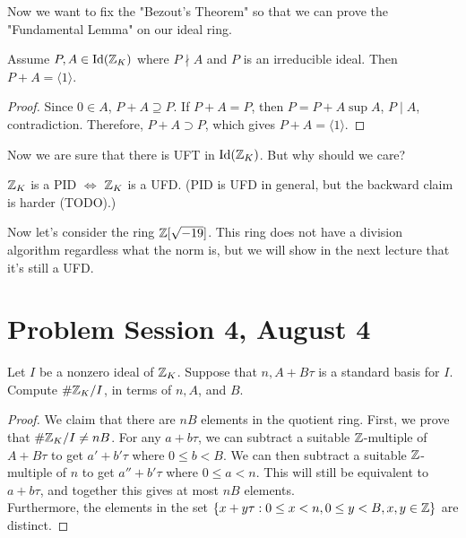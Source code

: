 \documentclass[12pt,twoside=semi,openright,numbers=noenddot]{scrbook}
\begin{document}
Now we want to fix the "Bezout's Theorem" so that we can prove the "Fundamental Lemma" on our ideal ring.
\begin{theorem}
    Assume $P, A \in \text{Id}(\mathbb Z_K)$ where $P \nmid A$ and $P$ is an irreducible ideal. Then $P+A = \langle 1 \rangle$.
\end{theorem}
    \begin{proof}
        Since $0 \in A$, $P+A \supseteq P$. If $P+A = P$, then $P = P+A \sup A$, $P \mid A$, contradiction.
        Therefore, $P+A \supset P$, which gives $P+A = \langle 1 \rangle$.
    \end{proof}

Now we are sure that there is UFT in $\text{Id}(\mathbb Z_K)$. But why should we care?
\begin{remark}
    $\mathbb Z_K$ is a PID $\Leftrightarrow$ $\mathbb Z_K$ is a UFD. (PID is UFD in general, but the backward claim is harder (TODO).)
\end{remark}

Now let's consider the ring $\mathbb Z[\sqrt{-19}]$. This ring does not have a division algorithm regardless what the norm is, but 
we will show in the next lecture that it's still a UFD.


\section{Problem Session 4, August 4}
\begin{problem}
    Let $I$ be a nonzero ideal of $\mathbb Z_{K}$. Suppose that $n, A+B \tau$ is a standard basis 
    for $I$. Compute $\# \mathbb Z_{K} / I$, in terms of $n, A$, and $B$.
\end{problem}
    \begin{proof}
        We claim that there are $nB$ elements in the quotient ring. 
        First, we prove that $\# \mathbb Z_K / I \neq nB$. For any $a + b\tau$, we can subtract a suitable $\mathbb Z$-multiple 
        of $A+B\tau$ to get $a'+b'\tau$ where $0 \leq b < B$. We can then subtract a suitable $\mathbb Z$-multiple of $n$ 
        to get $a''+b'\tau$ where $0 \leq a < n$. This will still be equivalent to $a+b\tau$, and together this gives at most 
        $nB$ elements. \\
        Furthermore, the elements in the set $\{x+y\tau:0 \leq x < n, 0 \leq y < B, x, y \in \mathbb Z\}$ are distinct.
    \end{proof}
\end{document}
